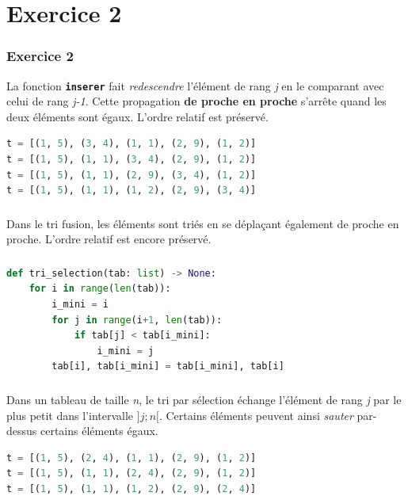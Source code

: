 \documentclass[svgnames,11pt]{beamer}
\begin{document}
\section{Exercice 2}
\begin{frame}[fragile]
    \frametitle{Exercice 2}
    La fonction \textbf{\texttt{inserer}} fait \emph{redescendre} l'élément de rang \emph{j} en le comparant avec celui de rang \emph{j-1}. Cette propagation \textbf{de proche en proche} s'arrête quand les deux éléments sont égaux. L'ordre relatif est préservé.
    \begin{center}
        \begin{lstlisting}[language=Python , basicstyle=\ttfamily\small, xleftmargin=2em, xrightmargin=2em]
t = [(1, 5), (3, 4), (1, 1), (2, 9), (1, 2)]
t = [(1, 5), (1, 1), (3, 4), (2, 9), (1, 2)]
t = [(1, 5), (1, 1), (2, 9), (3, 4), (1, 2)]
t = [(1, 5), (1, 1), (1, 2), (2, 9), (3, 4)]
\end{lstlisting}
        \label{CODE}
    \end{center}


\end{frame}
\begin{frame}
    \frametitle{}

    Dans le tri fusion, les éléments sont triés en se déplaçant également de proche en proche. L'ordre relatif est encore préservé.

\end{frame}
\begin{frame}[fragile]
    \frametitle{}

    \begin{center}
        \begin{lstlisting}[language=Python , basicstyle=\ttfamily\small, xleftmargin=1em, xrightmargin=1em]
def tri_selection(tab: list) -> None:
    for i in range(len(tab)):
        i_mini = i
        for j in range(i+1, len(tab)):
            if tab[j] < tab[i_mini]:
                i_mini = j
        tab[i], tab[i_mini] = tab[i_mini], tab[i]
\end{lstlisting}
        \label{CODE}
    \end{center}

\end{frame}
\begin{frame}[fragile]
    \frametitle{}

    Dans un tableau de taille \emph{n}, le tri par sélection échange l'élément de rang \emph{j} par le plus petit dans l'intervalle $]j;n[$. Certains éléments peuvent ainsi \emph{sauter} par-dessus certains éléments égaux.
    \begin{center}
        \begin{lstlisting}[language=Python , basicstyle=\ttfamily\small, xleftmargin=1em, xrightmargin=1em]
t = [(1, 5), (2, 4), (1, 1), (2, 9), (1, 2)]
t = [(1, 5), (1, 1), (2, 4), (2, 9), (1, 2)]
t = [(1, 5), (1, 1), (1, 2), (2, 9), (2, 4)]
\end{lstlisting}
        \label{CODE}
    \end{center}
\end{frame}
\end{document}
